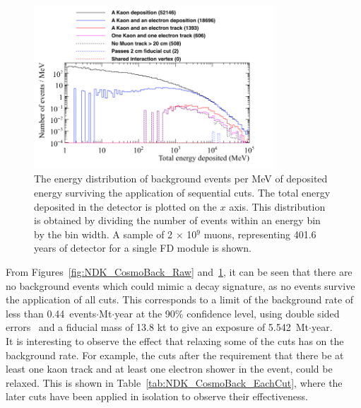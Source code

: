 \begin{figure}
  \centering
  \includegraphics[width=0.8\textwidth]{CosmicBackground_EnergyDepCuts_Norm_2cmCut}
  \caption[The energy distribution of background events per MeV of deposited energy surviving the application of sequential cuts]
          {The energy distribution of background events per MeV of deposited energy surviving the application of sequential cuts. The total energy deposited in the detector is plotted on the $x$ axis. This distribution is obtained by dividing the number of events within an energy bin by the bin width. A sample of 2 $\times$ 10$^9$ muons, representing 401.6 years of detector for a single FD module is shown.}
  \label{fig:NDK_CosmoBack_Norm}
\end{figure}

From Figures~\ref{fig:NDK_CosmoBack_Raw} and~\ref{fig:NDK_CosmoBack_Norm}, it can be seen that there are no background events which could mimic a decay signature, as no events survive the application of all cuts. This corresponds to a limit of the background rate of less than 0.44~events$\cdot$Mt$\cdot$year at the 90\% confidence level, using double sided errors~\citep{PDGReview} and a fiducial mass of 13.8 kt to give an exposure of 5.542~Mt$\cdot$year. \\

It is interesting to observe the effect that relaxing some of the cuts has on the background rate. For example, the cuts after the requirement that there be at least one kaon track and at least one electron shower in the event, could be relaxed. This is shown in Table~\ref{tab:NDK_CosmoBack_EachCut}, where the later cuts have been applied in isolation to observe their effectiveness. \\

